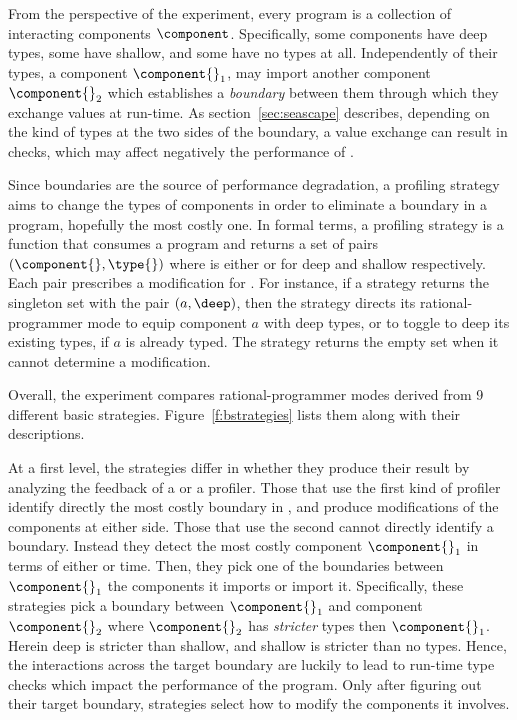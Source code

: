 
From the perspective of the experiment, every program \program{} is a
collection of interacting components $\component$. Specifically, some
components have deep types, some  have shallow, and some  have no types at
all. Independently of their types, a component $\component{}_1$, may import
another component $\component{}_2$  which establishes a
\emph{boundary} between them through which they exchange values at
run-time. As section~\ref{sec:seascape} describes, depending on the kind of types at
the two sides of the boundary, a value exchange can result in checks,
which may affect negatively the performance of \program{}. 

 Since boundaries are the source of performance degradation, a profiling
 strategy aims to change the types of components in order to eliminate a
 boundary in a program, hopefully the most costly one. In formal terms, a
 profiling strategy is a function that consumes a program \program{} and
 returns a set of pairs $(\component{}, \type{})$ where \type{} is either
 \deep{} or \shallow{} for deep and shallow respectively. Each pair
 prescribes a modification for \program{}. For instance, if a strategy
 returns the singleton set with the pair $(a,\deep)$, then the strategy
 directs its rational-programmer mode to equip component $a$ with deep
 types, or to toggle to deep its existing types, if $a$ is already
 typed. The strategy returns the empty set when it cannot determine a
 modification.

 Overall, the experiment compares rational-programmer modes
 derived from 9 different basic strategies. Figure~\ref{f:bstrategies}
 lists them along with their descriptions.

 At a first level, the strategies differ in whether they produce their
 result by analyzing the feedback of a \featkw{} or a \statkw{} profiler.
 Those that use the first kind of profiler identify directly the most
 costly boundary in \program{}, and produce modifications of the
 components at either side.  Those that use the second cannot directly
 identify a boundary.  Instead they detect the most costly component
 $\component{}_1$ in terms of either \selfkw{} or \totalkw{} time.  Then,
 they pick  one of the boundaries between $\component{}_1$ the components it
 imports or import it.  Specifically, these strategies pick a boundary
 between $\component{}_1$ and component $\component{}_2$ where
 $\component{}_2$
 has \emph{stricter} types then $\component{}_1$. Herein deep is stricter
 than shallow, and shallow is stricter than no types.  Hence, the
 interactions across the target boundary are luckily to lead to run-time
 type checks which impact the performance of the program.  Only after
 figuring out their target boundary, \statkw{} strategies select how to
 modify the components it involves.

